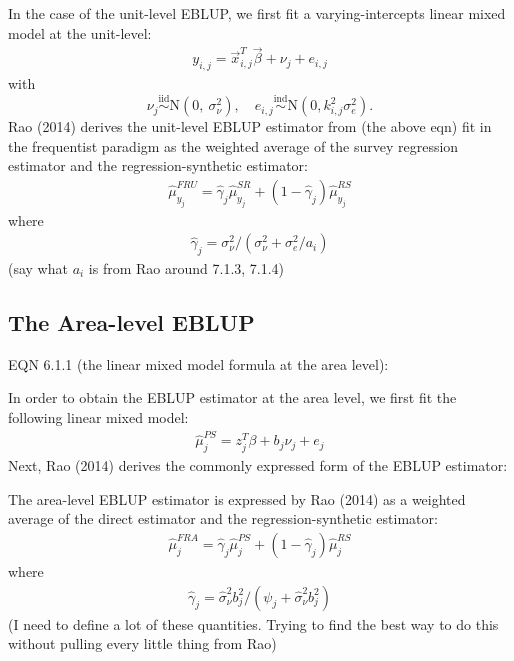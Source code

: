 \documentclass[12pt,twoside]{reedthesis}
\begin{document}
In the case of the unit-level EBLUP, we first fit a varying-intercepts linear mixed model at the unit-level:
\begin{align}
y_{i,j} = \vec x_{i,j}^T \vec \beta + \nu_j + e_{i,j}
\end{align}
with
\[
 \newcommand\myeq{\stackrel{\mathclap{\normalfont\mbox{s}}}{~}}
\nu_j \stackrel{\text{iid}}{\sim} \text{N}(0,~ \sigma^2_{\nu}), \quad e_{i,j} \stackrel{\text{ind}}{\sim}\text{N}(0, k^2_{i,j}\sigma^2_e).
\]
Rao (2014) derives the unit-level EBLUP estimator from (the above eqn) fit in the frequentist paradigm as the weighted average of the survey regression estimator and the regression-synthetic estimator:
\begin{align}
\hat \mu_{y_j}^{FRU} = \hat \gamma_j \hat\mu_{y_j}^{SR} + (1 - \hat \gamma_j) \hat\mu_{y_j}^{RS}
\end{align}
where
\begin{align}
\hat\gamma_j = \sigma^2_\nu / (\sigma^2_\nu + \sigma^2_e / a_i)
\end{align}
(say what \(a_i\) is from Rao around 7.1.3, 7.1.4)

\hypertarget{the-area-level-eblup}{%
\subsection{The Area-level EBLUP}\label{the-area-level-eblup}}

EQN 6.1.1 (the linear mixed model formula at the area level):

In order to obtain the EBLUP estimator at the area level, we first fit the following linear mixed model:
\begin{align}
\hat\mu_{j}^{PS} = z_j^T \beta + b_j \nu_j + e_j
\end{align}
Next, Rao (2014) derives the commonly expressed form of the EBLUP estimator:

The area-level EBLUP estimator is expressed by Rao (2014) as a weighted average of the direct estimator and the regression-synthetic estimator:
\begin{align}
\hat \mu_j^{FRA} = \hat\gamma_j \hat\mu_j^{PS} + (1 - \hat\gamma_j) \hat\mu_j^{RS} \label{eq:eblup-area-weight}
\end{align}
where
\begin{align}
\hat \gamma_j = \hat \sigma_\nu^2 b_j^2 / (\psi_j + \hat\sigma_\nu^2 b_j^2)
\end{align}
(I need to define a lot of these quantities. Trying to find the best way to do this without pulling every little thing from Rao)
\end{document}
